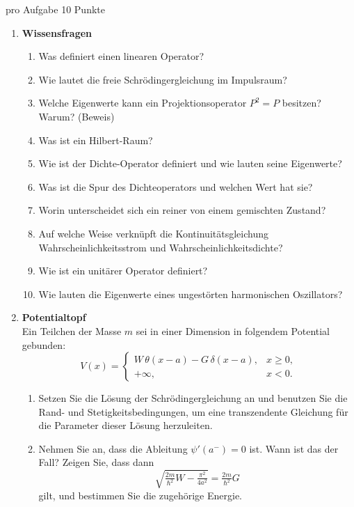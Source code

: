 \documentclass[11pt,a4paper]{article}
\begin{document}
\vspace{1em}
\noindent pro Aufgabe 10 Punkte

\begin{enumerate}

\item \textbf{Wissensfragen}
\begin{enumerate}
  \item Was definiert einen linearen Operator?
  \item Wie lautet die freie Schrödingergleichung im Impulsraum?
  \item Welche Eigenwerte kann ein Projektionsoperator $P^2=P$ besitzen? Warum? (Beweis)
  \item Was ist ein Hilbert-Raum?
  \item Wie ist der Dichte-Operator definiert und wie lauten seine Eigenwerte?
  \item Was ist die Spur des Dichteoperators und welchen Wert hat sie?
  \item Worin unterscheidet sich ein reiner von einem gemischten Zustand?
  \item Auf welche Weise verknüpft die Kontinuitätsgleichung Wahrscheinlichkeitsstrom und Wahrscheinlichkeitsdichte?
  \item Wie ist ein unitärer Operator definiert?
  \item Wie lauten die Eigenwerte eines ungestörten harmonischen Oszillators?
\end{enumerate}

\item \textbf{Potentialtopf}\\
Ein Teilchen der Masse $m$ sei in einer Dimension in folgendem Potential gebunden:
\[
V(x)=\begin{cases}
W\,\theta(x-a)-G\,\delta(x-a), & x\geq 0,\\
+\infty, & x<0.
\end{cases}
\]
\begin{enumerate}
  \item Setzen Sie die Lösung der Schrödingergleichung an und benutzen Sie die Rand- und Stetigkeitsbedingungen, um eine transzendente Gleichung für die Parameter dieser Lösung herzuleiten.
  \item Nehmen Sie an, dass die Ableitung $\psi'(a^-)=0$ ist. Wann ist das der Fall? Zeigen Sie, dass dann
  \[
  \sqrt{\tfrac{2m}{\hbar^2}W - \tfrac{\pi^2}{4a^2}} = \tfrac{2m}{\hbar^2}G
  \]
  gilt, und bestimmen Sie die zugehörige Energie.
\end{enumerate}


\end{enumerate}
\end{document}
